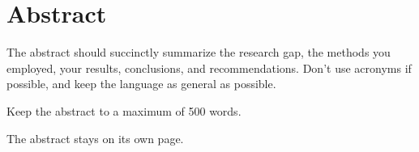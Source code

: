 \chapter*{Abstract}%
%
%
%

The abstract should succinctly summarize the research gap, the methods you employed, your results, conclusions, and recommendations.  Don’t use acronyms if possible, and keep the language as general as possible.

\medskip

Keep the abstract to a maximum of 500 words.

\medskip

The abstract stays on its own page.